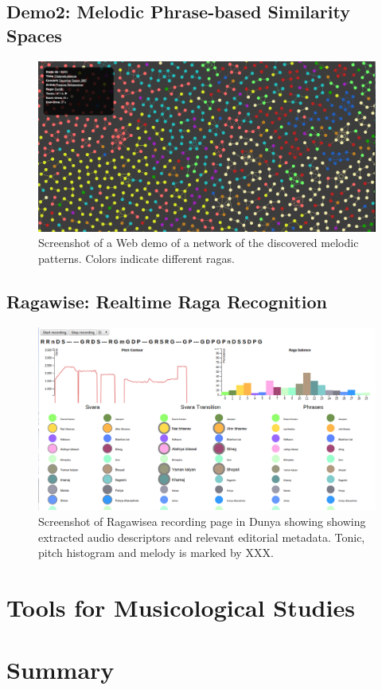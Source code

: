 \subsection*{Demo2: Melodic Phrase-based Similarity Spaces}



\begin{figure}
	\begin{center}
		\includegraphics[width=\figSizeHundred]{ch08_applications/figures/patternNetwork1.png}
	\end{center}
	\caption{Screenshot of a Web demo of a network of the discovered melodic patterns. Colors indicate different \glspl{raga}.}
	\label{fig:network_patterns}
\end{figure}



\subsection*{Ragawise: Realtime Raga Recognition}
\label{sec:ragawise}

\begin{figure}
	\begin{center}
		\includegraphics[width=\figSizeHundred]{ch08_applications/figures/ragawise.png}
	\end{center}
	\caption{Screenshot of Ragawisea recording page in Dunya showing showing extracted audio descriptors and relevant editorial metadata. Tonic, pitch histogram and melody is marked by XXX.}
	\label{fig:dunya_recording}
\end{figure}


\section{Tools for Musicological Studies}

\section{Summary}



